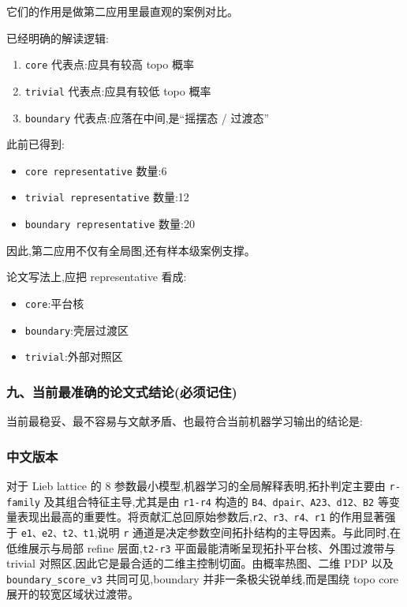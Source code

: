 \documentclass[lang=cn,scheme=chinese,color=blue,device=normal,toc=onecol,math=cm]{elegantbook}
\begin{document}
它们的作用是做第二应用里最直观的案例对比。\par


已经明确的解读逻辑:\par


\begin{enumerate}
\item \texttt{core} 代表点:应具有较高 topo 概率
\item \texttt{trivial} 代表点:应具有较低 topo 概率
\item \texttt{boundary} 代表点:应落在中间,是“摇摆态 /\allowbreak{} 过渡态”
\end{enumerate}


此前已得到:\par


\begin{itemize}
\item \texttt{core representative} 数量:6
\item \texttt{trivial representative} 数量:12
\item \texttt{boundary representative} 数量:20
\end{itemize}


因此,第二应用不仅有全局图,还有样本级案例支撑。\par


论文写法上,应把 representative 看成:\par


\begin{itemize}
\item \texttt{core}:平台核
\item \texttt{boundary}:壳层过渡区
\item \texttt{trivial}:外部对照区
\end{itemize}


\subsubsection{九、当前最准确的论文式结论(必须记住)}


当前最稳妥、最不容易与文献矛盾、也最符合当前机器学习输出的结论是:\par


\subsubsection{中文版本}


对于 Lieb lattice 的 8 参数最小模型,机器学习的全局解释表明,拓扑判定主要由 \texttt{r-family} 及其组合特征主导,尤其是由 \texttt{r1-r4} 构造的 \texttt{B4、dpair、A23、d12、B2} 等变量表现出最高的重要性。将贡献汇总回原始参数后,\texttt{r2、r3、r4、r1} 的作用显著强于 \texttt{e1、e2、t2、t1},说明 \texttt{r} 通道是决定参数空间拓扑结构的主导因素。与此同时,在低维展示与局部 refine 层面,\texttt{t2-r3} 平面最能清晰呈现拓扑平台核、外围过渡带与 trivial 对照区,因此它是最合适的二维主控制切面。由概率热图、二维 PDP 以及 \texttt{boundary\_\allowbreak{}score\_\allowbreak{}v3} 共同可见,boundary 并非一条极尖锐单线,而是围绕 topo core 展开的较宽区域状过渡带。\par
\end{document}
